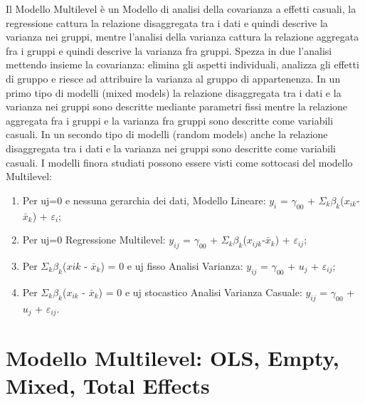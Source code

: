 \documentclass[a4page, 11pt]{article}
\begin{document}
Il Modello Multilevel è un Modello di analisi della covarianza a effetti casuali, la regressione cattura la relazione disaggregata tra i dati e quindi descrive la varianza nei gruppi, mentre l’analisi della varianza cattura la relazione aggregata fra i gruppi e quindi descrive la varianza fra gruppi. Spezza in due l’analisi mettendo insieme la covarianza: elimina gli aspetti individuali, analizza gli effetti di gruppo e riesce ad attribuire la varianza al gruppo di appartenenza.
\newline
In un primo tipo di modelli (mixed models) la relazione disaggregata tra i dati e la varianza nei gruppi sono descritte mediante parametri fissi mentre la relazione aggregata fra i gruppi
e la varianza fra gruppi sono descritte come variabili casuali.
\newline
In un secondo tipo di modelli (random models) anche la relazione disaggregata tra i dati e la varianza nei gruppi sono descritte come variabili casuali.
\newline
\newline
I modelli finora studiati possono essere visti come sottocasi del modello Multilevel:
\begin{enumerate}
\item Per uj=0 e nessuna gerarchia dei dati, Modello Lineare: $y_i$ = $\gamma_{00}$ + $\Sigma_k$$\beta_k$($x_{ik}$-$\bar{x}_k$) + $\varepsilon_i$;
\item Per uj=0 Regressione Multilevel: $y_{ij}$ = $\gamma_{00}$ + $\Sigma_k$$\beta_k$($x_{ijk}$-$\bar{x}_k$) + $\varepsilon_{ij}$;
\item Per $\Sigma_k$$\beta_k$($x{ik}$ - $\bar{x}_k$) = 0 e uj fisso Analisi Varianza: $y_{ij}$ = $\gamma_{00}$ + $u_j$ + $\varepsilon_{ij}$;
\item Per $\Sigma_k$$\beta_k$($x_{ik}$ - $\bar{x}_k$) = 0 e uj stocastico Analisi Varianza Casuale: $y_{ij}$ = $\gamma_{00}$ + $u_j$ + $\varepsilon_{ij}$.
\end{enumerate}

\section{Modello Multilevel: OLS, Empty, Mixed, Total Effects}
\end{document}
